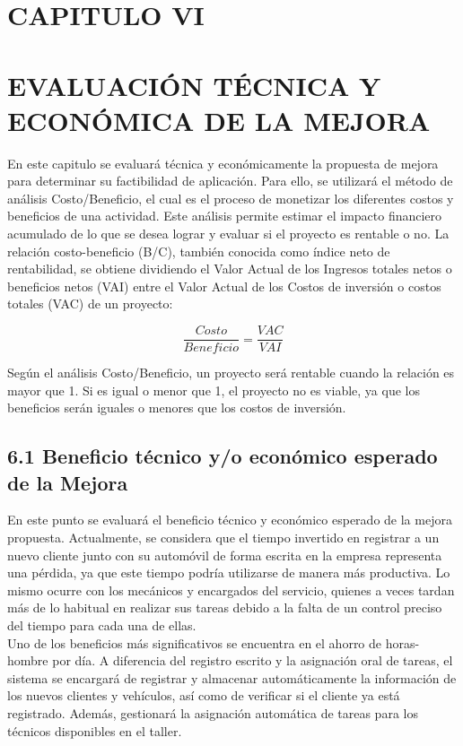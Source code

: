 \newpage
\section{CAPITULO VI}
\section*{EVALUACIÓN TÉCNICA Y ECONÓMICA DE LA MEJORA}
En este capitulo se evaluará técnica y económicamente la propuesta de mejora para determinar su factibilidad de aplicación. Para ello, se utilizará el método de análisis Costo/Beneficio, el cual es el proceso de monetizar los diferentes costos y beneficios de una actividad. Este análisis permite estimar el impacto financiero acumulado de lo que se desea lograr y evaluar si el proyecto es rentable o no.
La relación costo-beneficio (B/C), también conocida como índice neto de rentabilidad, se obtiene dividiendo el Valor Actual de los Ingresos totales netos o beneficios netos (VAI) entre el Valor Actual de los Costos de inversión o costos totales (VAC) de un proyecto:

\[\frac{Costo}{Beneficio} = \frac{VAC}{VAI}\]

Según el análisis Costo/Beneficio, un proyecto será rentable cuando la relación es mayor que 1. Si es igual o menor que 1, el proyecto no es viable, ya que los beneficios serán iguales o menores que los costos de inversión.

\subsection{6.1 Beneficio técnico y/o económico esperado de la Mejora}
En este punto se evaluará el beneficio técnico y económico esperado de la mejora propuesta.
Actualmente, se considera que el tiempo invertido en registrar a un nuevo cliente junto con su automóvil de forma escrita en la empresa representa una pérdida, ya que este tiempo podría utilizarse de manera más productiva. Lo mismo ocurre con los mecánicos y encargados del servicio, quienes a veces tardan más de lo habitual en realizar sus tareas debido a la falta de un control preciso del tiempo para cada una de ellas.\\

Uno de los beneficios más significativos se encuentra en el ahorro de horas-hombre por día. A diferencia del registro escrito y la asignación oral de tareas, el sistema se encargará de registrar y almacenar automáticamente la información de los nuevos clientes y vehículos, así como de verificar si el cliente ya está registrado. Además, gestionará la asignación automática de tareas para los técnicos disponibles en el taller.\\


